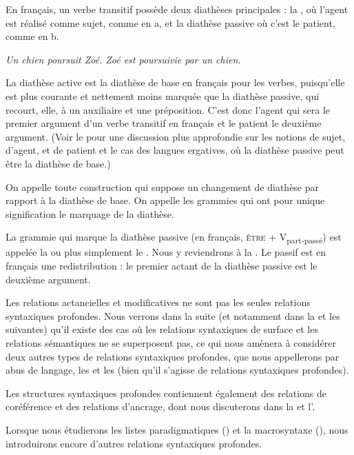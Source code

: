 En français, un verbe transitif possède deux diathèses principales : la , où l'agent est réalisé comme sujet, comme en a,  et la diathèse passive où c'est le patient, comme en b.

\ea\label{ex:13-diathese}
\ea \textit{Un chien poursuit Zoé.}
\ex \textit{Zoé est poursuivie par un chien.}\z\z

La diathèse active est la diathèse de base en français pour les verbes, puisqu'elle est plus courante et nettement moins marquée que la diathèse passive, qui recourt, elle, à un auxiliaire et une préposition. C'est donc l'agent qui sera le premier argument d'un verbe transitif en français et le patient le deuxième argument. (Voir le  pour une discussion plus approfondie sur les notions de sujet, d'agent, et de patient et le cas des langues ergatives, où la diathèse passive peut être la diathèse de base.)

{On appelle  toute construction qui suppose un changement de diathèse par rapport à la diathèse de base. On appelle  les grammies qui ont pour unique signification le marquage de la diathèse.}

La grammie qui marque la diathèse passive (en français, \textsc{être} + V\textsubscript{part-passé}) est appelée la  ou plus simplement le . Nous y reviendrons à la . Le passif est en français une redistribution : le premier actant de la diathèse passive est le deuxième argument.

Les relations actancielles et modificatives ne sont pas les seules relations syntaxiques profondes.
Nous verrons dans la suite (et notamment dans la  et les suivantes) qu’il existe des cas où les relations syntaxiques de surface et les relations sémantiques ne se superposent pas, ce qui nous amènera à considérer deux autres types de relations syntaxiques profondes, que nous appellerons par abus de langage, les  et les  (bien qu'il s'agisse de relations syntaxiques profondes).

Les structures syntaxiques profondes contiennent également des relations de coréférence et des relations d’ancrage, dont nous discuterons dans la  et l’.

Lorsque nous étudierons les listes paradigmatiques () et la macrosyntaxe (), nous introduirons encore d’autres relations syntaxiques profondes.

